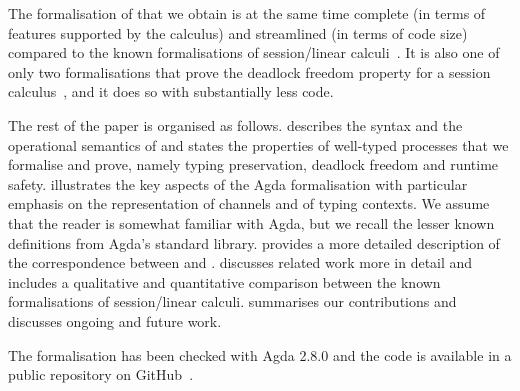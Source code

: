 The formalisation of \LCC that we obtain is at the same time complete (in terms
of features supported by the calculus) and streamlined (in terms of code size)
compared to the known formalisations of session/linear
calculi~\cite{GotoEtAl16,Thiemann19,CastroFerreiraYoshida20,CicconePadovani20,RouvoetPoulsenKrebbersVisser20,SanoKavanaghPientka23,JacobsBalzerKrebbers22,ZackonEtAl25,ZalakainDardha21}.
It is also one of only two formalisations that prove the deadlock freedom
property for a session calculus~\cite{JacobsBalzerKrebbers22}, and it does so
with substantially less code.

The rest of the paper is organised as follows.
%
 describes the syntax and the operational semantics of \LCC
and states the properties of well-typed processes that we formalise and prove,
namely typing preservation, deadlock freedom and runtime safety.
%
 illustrates the key aspects of the Agda formalisation with
particular emphasis on the representation of channels and of typing contexts. We
assume that the reader is somewhat familiar with Agda, but we recall the lesser
known definitions from Agda's standard library.
%
 provides a more detailed description of the
correspondence between \CP and \LCC.
%
 discusses related work more in detail and includes a
qualitative and quantitative comparison between the known formalisations of
session/linear calculi.
%
 summarises our contributions and discusses ongoing and
future work.

The formalisation has been checked with Agda 2.8.0 and the code is available in
a public repository on GitHub~\cite{PadovaniRaffaelli25}.

